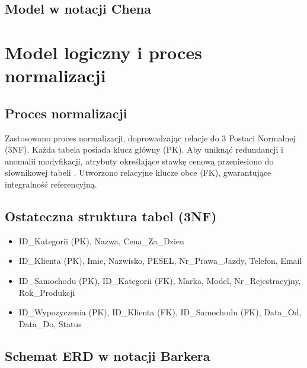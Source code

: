 \documentclass[a4paper,11pt,english,openany,oneside]{sphinxmanual}
\begin{document}
\subsection{Model w notacji Chena}
\label{\detokenize{rozdzial_3/index:model-w-notacji-chena}}

\section{Model logiczny i proces normalizacji}
\label{\detokenize{rozdzial_3/index:model-logiczny-i-proces-normalizacji}}

\subsection{Proces normalizacji}
\label{\detokenize{rozdzial_3/index:proces-normalizacji}}
\sphinxAtStartPar
Zastosowano proces normalizacji, doprowadzając relacje do 3 Postaci Normalnej (3NF). Każda tabela posiada klucz główny (PK). Aby uniknąć redundancji i anomalii modyfikacji, atrybuty określające stawkę cenową przeniesiono do słownikowej tabeli . Utworzono relacyjne klucze obce (FK), gwarantujące integralność referencyjną.


\subsection{Ostateczna struktura tabel (3NF)}
\label{\detokenize{rozdzial_3/index:ostateczna-struktura-tabel-3nf}}\begin{itemize}
\item {} 
\sphinxAtStartPar
{} ID\_Kategorii (PK), Nazwa, Cena\_Za\_Dzien

\item {} 
\sphinxAtStartPar
{} ID\_Klienta (PK), Imie, Nazwisko, PESEL, Nr\_Prawa\_Jazdy, Telefon, Email

\item {} 
\sphinxAtStartPar
{} ID\_Samochodu (PK), ID\_Kategorii (FK), Marka, Model, Nr\_Rejestracyjny, Rok\_Produkcji

\item {} 
\sphinxAtStartPar
{} ID\_Wypozyczenia (PK), ID\_Klienta (FK), ID\_Samochodu (FK), Data\_Od, Data\_Do, Status

\end{itemize}


\subsection{Schemat ERD w notacji Barkera}
\label{\detokenize{rozdzial_3/index:schemat-erd-w-notacji-barkera}}
\end{document}
